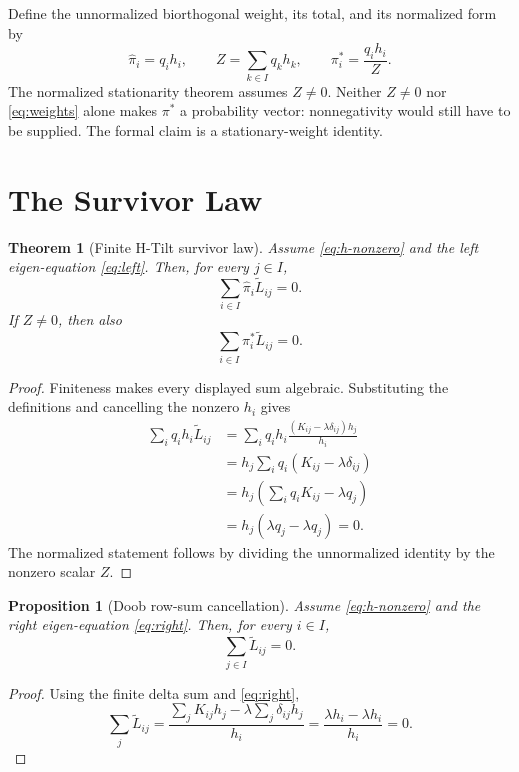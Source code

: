 \documentclass[10pt]{article}
\newtheorem{theorem}{Theorem}
\newtheorem{proposition}{Proposition}
\newcommand{\pistar}{\pi^{*}}
\newcommand{\Ltilde}{\widetilde L}
\begin{document}
Define the unnormalized biorthogonal weight, its total, and its normalized
form by
\begin{equation}\label{eq:weights}
  \widehat\pi_i=q_i h_i,\qquad
  Z=\sum_{k\in I}q_kh_k,\qquad
  \pistar_i=\frac{q_i h_i}{Z}.
\end{equation}
The normalized stationarity theorem assumes \(Z\ne0\). Neither \(Z\ne0\) nor
\eqref{eq:weights} alone makes \(\pistar\) a probability vector: nonnegativity
would still have to be supplied. The formal claim is a stationary-weight
identity.

\section{The Survivor Law}

\begin{theorem}[Finite H-Tilt survivor law]\label{thm:survivor}
Assume \eqref{eq:h-nonzero} and the left eigen-equation \eqref{eq:left}. Then,
for every \(j\in I\),
\[
  \sum_{i\in I}\widehat\pi_i\Ltilde_{ij}=0.
\]
If \(Z\ne0\), then also
\[
  \sum_{i\in I}\pistar_i\Ltilde_{ij}=0.
\]
\end{theorem}

\begin{proof}
Finiteness makes every displayed sum algebraic. Substituting the definitions
and cancelling the nonzero \(h_i\) gives
\begin{align*}
  \sum_i q_i h_i\Ltilde_{ij}
  &=
  \sum_i q_i h_i
    \frac{(K_{ij}-\lambda\delta_{ij})h_j}{h_i}\\
  &=
  h_j\sum_i q_i(K_{ij}-\lambda\delta_{ij})\\
  &=
  h_j\left(\sum_i q_iK_{ij}-\lambda q_j\right)\\
  &=
  h_j(\lambda q_j-\lambda q_j)
  =0.
\end{align*}
The normalized statement follows by dividing the unnormalized identity by the
nonzero scalar \(Z\).
\end{proof}

\begin{proposition}[Doob row-sum cancellation]\label{prop:rows}
Assume \eqref{eq:h-nonzero} and the right eigen-equation \eqref{eq:right}.
Then, for every \(i\in I\),
\[
  \sum_{j\in I}\Ltilde_{ij}=0.
\]
\end{proposition}

\begin{proof}
Using the finite delta sum and \eqref{eq:right},
\[
  \sum_j\Ltilde_{ij}
  =
  \frac{\sum_j K_{ij}h_j-\lambda\sum_j\delta_{ij}h_j}{h_i}
  =
  \frac{\lambda h_i-\lambda h_i}{h_i}
  =0.
\]
\end{proof}
\end{document}
